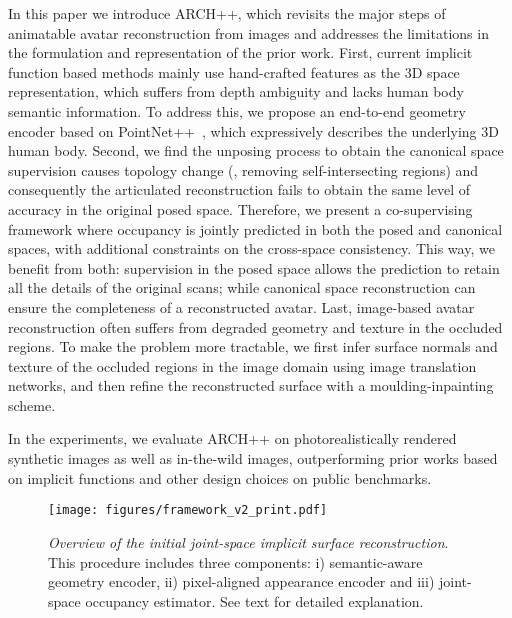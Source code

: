\documentclass[10pt,twocolumn,letterpaper]{article}
\newcommand{\beforefigcaption}{\vspace{-5mm}}
\newcommand{\afterfigcaption}{\vspace{-5mm}}
\begin{document}
In this paper we introduce ARCH++, which revisits the major steps of animatable avatar reconstruction from images and addresses the limitations in the formulation and representation of the prior work.
First, current implicit function based methods mainly use hand-crafted features as the 3D space representation, which suffers from depth ambiguity and lacks human body semantic information. To address this, we propose an end-to-end geometry encoder based on PointNet++~\cite{qi2017pointnet,qi2017pointnet++}, which expressively describes the underlying 3D human body. 
Second, we find the unposing process to obtain the canonical space supervision causes topology change (\eg, removing self-intersecting regions) and consequently the articulated reconstruction fails to obtain the same level of accuracy in the original posed space.
Therefore, we present a co-supervising framework where occupancy is jointly predicted in both the posed and canonical spaces, with additional constraints on the cross-space consistency. This way, we benefit from both: supervision in the posed space allows the prediction to retain all the details of the original scans; while canonical space reconstruction can ensure the completeness of a reconstructed avatar. 
Last, image-based avatar reconstruction often suffers from degraded geometry and texture in the occluded regions. To make the problem more tractable, we first infer surface normals and texture of the occluded regions in the image domain using image translation networks, and then refine the reconstructed surface with a moulding-inpainting scheme.

In the experiments, we evaluate ARCH++ on photorealistically rendered synthetic images as well as in-the-wild images, outperforming prior works based on implicit functions and other design choices on public benchmarks.

\begin{figure*}[ptb]
\vspace{-2mm}
\centering
\texttt{[image: figures/framework\_v2\_print.pdf]}
\beforefigcaption
\vspace{0.5mm}
\caption{\emph{Overview of the initial joint-space implicit surface reconstruction}. This procedure includes three components: i) semantic-aware geometry encoder, ii) pixel-aligned appearance encoder and iii) joint-space occupancy estimator. See text for detailed explanation.
}
\afterfigcaption
\label{fig:framework}
\end{figure*}
\end{document}
